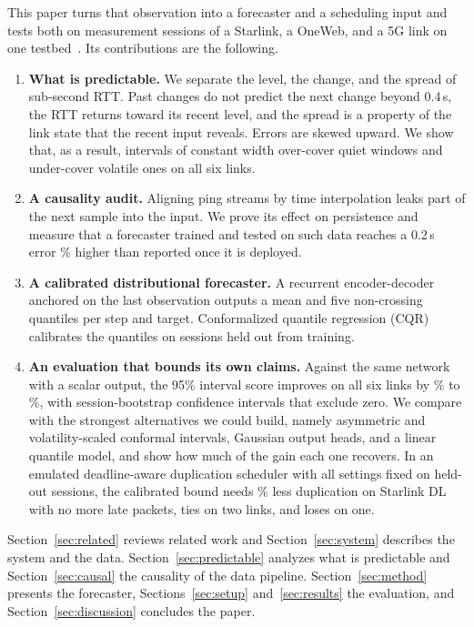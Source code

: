 This paper turns that observation into a forecaster and a scheduling input and tests both on \DataSessions{} measurement sessions of a Starlink, a OneWeb, and a 5G link on one testbed~\cite{islam2025design}. Its contributions are the following.
\begin{enumerate}
  \item \textbf{What is predictable.} We separate the level, the change, and the spread of sub-second RTT. Past changes do not predict the next change beyond 0.4\,s, the RTT returns toward its recent level, and the spread is a property of the link state that the recent input reveals. Errors are skewed upward. We show that, as a result, intervals of constant width over-cover quiet windows and under-cover volatile ones on all six links.
  \item \textbf{A causality audit.} Aligning ping streams by time interpolation leaks part of the next sample into the input. We prove its effect on persistence and measure that a forecaster trained and tested on such data reaches a 0.2\,s error \LeakOptDSMAEhOne\% higher than reported once it is deployed.
  \item \textbf{A calibrated distributional forecaster.} A recurrent encoder-decoder anchored on the last observation outputs a mean and five non-crossing quantiles per step and target. Conformalized quantile regression (CQR)~\cite{romano2019conformalized} calibrates the quantiles on sessions held out from training.
  \item \textbf{An evaluation that bounds its own claims.} Against the same network with a scalar output, the 95\% interval score improves on all six links by \BSISWorstAbs\% to \BSISBestAbs\%, with session-bootstrap confidence intervals that exclude zero. We compare with the strongest alternatives we could build, namely asymmetric and volatility-scaled conformal intervals, Gaussian output heads, and a linear quantile model, and show how much of the gain each one recovers. In an emulated deadline-aware duplication scheduler with all settings fixed on held-out sessions, the calibrated bound needs \SchedSaveSLDL\% less duplication on Starlink DL with no more late packets, ties on two links, and loses on one.
\end{enumerate}

Section~\ref{sec:related} reviews related work and Section~\ref{sec:system} describes the system and the data. Section~\ref{sec:predictable} analyzes what is predictable and Section~\ref{sec:causal} the causality of the data pipeline. Section~\ref{sec:method} presents the forecaster, Sections~\ref{sec:setup} and~\ref{sec:results} the evaluation, and Section~\ref{sec:discussion} concludes the paper.
